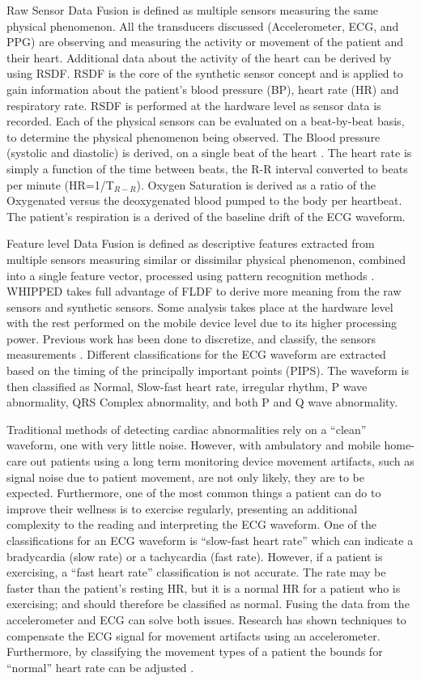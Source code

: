 Raw Sensor Data Fusion is defined as multiple sensors measuring the same physical phenomenon. All the transducers discussed (Accelerometer, ECG, and PPG) are observing and measuring the activity or movement of the patient and their heart. Additional data about the activity of the heart can be derived by using RSDF. RSDF is the core of the synthetic sensor concept and is applied to gain information about the patient's blood pressure (BP), heart rate (HR) and respiratory rate. RSDF is performed at the hardware level as sensor data is recorded. Each of the physical sensors can be evaluated on a beat-by-beat basis, to determine the physical phenomenon being observed. The Blood pressure (systolic and diastolic) is derived, on a single beat of the heart \cite{Poon2005}. The heart rate is simply a function of the time between beats, the R-R interval converted to beats per minute (HR=1/T$_{R-R}$). Oxygen Saturation is derived as a ratio of the Oxygenated versus the deoxygenated blood pumped to the body per heartbeat. The patient's respiration is a derived of the baseline drift of the ECG waveform. 

Feature level Data Fusion is defined as descriptive features extracted from multiple sensors measuring similar or dissimilar physical phenomenon, combined into a single feature vector,  processed using pattern recognition methods \cite{DaSilva2012}. WHIPPED takes full advantage of FLDF to derive more meaning from the raw sensors and synthetic sensors. Some analysis takes place at the hardware level with the rest performed on the mobile device level due to its higher processing power. Previous work has been done to discretize, and classify, the sensors measurements \cite{Chaiyasucheeva2012,DaSilva2012}. Different classifications for the ECG waveform are extracted based on the timing of the principally important points (PIPS).  The waveform is then classified as Normal, Slow-fast heart rate, irregular rhythm, P wave abnormality, QRS Complex abnormality, and both P and Q wave abnormality. 

Traditional methods of detecting cardiac abnormalities rely on a “clean” waveform, one with very little noise. However, with ambulatory and mobile home-care out patients using a long term monitoring device movement artifacts, such as signal noise due to patient movement, are not only likely, they are to be expected. Furthermore, one of the most common things a patient can do to improve their wellness is to exercise regularly, presenting an additional complexity to the reading and interpreting the ECG waveform. One of the classifications for an ECG waveform is “slow-fast heart rate” which can indicate a bradycardia (slow rate) or a tachycardia (fast rate). However, if a patient is exercising, a “fast heart rate” classification is not accurate. The rate may be faster than the patient's resting HR, but it is a normal HR for a patient who is exercising; and should therefore be classified as normal. Fusing the data from the accelerometer and ECG can solve both issues. Research has shown techniques to compensate the ECG signal for movement artifacts using an accelerometer. Furthermore, by classifying the movement types of a patient the bounds for “normal” heart rate can be adjusted \cite{Shannon2012}.

